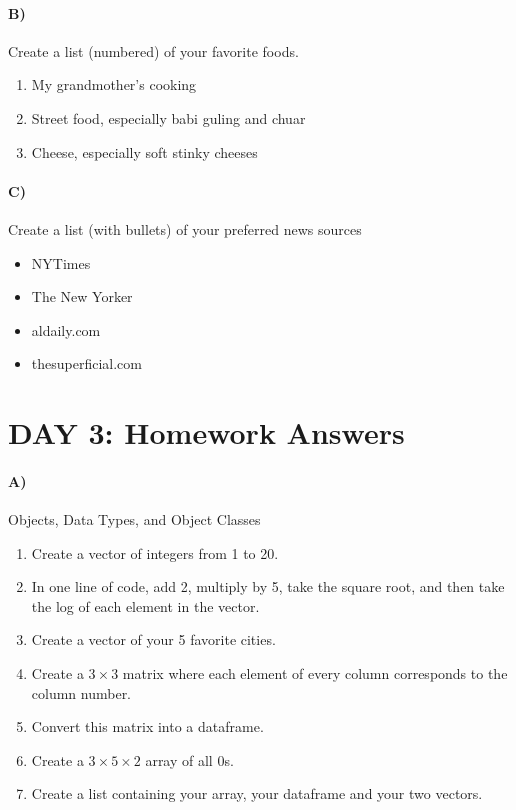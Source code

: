 \documentclass[10pt]{article}
\begin{document}
\paragraph{B)} Create a list (numbered) of your favorite foods.
\begin{enumerate}
\item My grandmother's cooking
\item Street food, especially babi guling and chuar
\item Cheese, especially soft stinky cheeses
\end{enumerate}

\paragraph{C)} Create a list (with bullets) of your preferred news sources
\begin{itemize}
\item NYTimes
\item The New Yorker
\item aldaily.com
\item thesuperficial.com
\end{itemize}

\section*{DAY 3: Homework Answers}

\paragraph{A)} Objects, Data Types, and Object Classes

\begin{enumerate}
\item Create a vector of integers from 1 to 20.  
\item In one line of code, add 2, multiply by 5, take the square root, and then take the log of each element in the vector.
\item Create a vector of your 5 favorite cities.
\item Create a $3 \times 3$ matrix where each element of every column corresponds to the column number.
\item Convert this matrix into a dataframe.
\item Create a $3 \times 5 \times 2$ array of all 0s.
\item Create a list containing your array, your dataframe and your two vectors. 
\end{enumerate}
\end{document}
